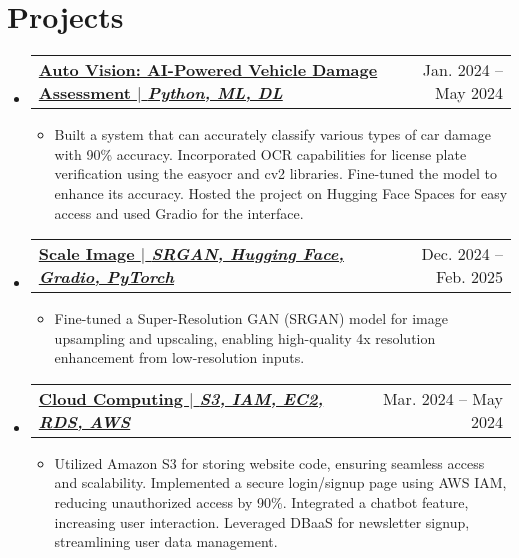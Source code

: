 \documentclass[letterpaper,10pt]{article}
\makeatletter
\newcommand{\resumeItem}[1]{
  \item\small{
    {#1 \vspace{-2pt}}
  }
}
\newcommand{\resumeProjectHeading}[3]{
    \item
    \begin{tabular*}{0.97\textwidth}{l@{\extracolsep{\fill}}r}
      \small\textbf{\href{#3}{#1}} & #2 \\
    \end{tabular*}\vspace{-7pt}
}
\newcommand{\resumeSubHeadingListStart}{\begin{itemize}[leftmargin=0.15in, label={}]}
\newcommand{\resumeSubHeadingListEnd}{\end{itemize}}
\newcommand{\resumeItemListStart}{\begin{itemize}}
\newcommand{\resumeItemListEnd}{\end{itemize}\vspace{-5pt}}
\makeatother
\begin{document}
\section{Projects}
\resumeSubHeadingListStart

  \resumeProjectHeading
    {Auto Vision: AI-Powered Vehicle Damage Assessment $|$ \emph{Python, ML, DL}}
    {Jan. 2024 -- May 2024}
    {https://www.linkedin.com/posts/chandanashastri_autovision-ai-machinelearning-activity-7190037479909969921-WMZe?utm_source=share\&utm_medium=member_desktop\&rcm=ACoAADK9cGQBBQ2ytaQ6riFqnJbrcOA1OnfGoc0}
  \resumeItemListStart
    \resumeItem{Built a system that can accurately classify various types of car damage with 90\% accuracy. Incorporated OCR capabilities for license plate verification using the easyocr and cv2 libraries. Fine-tuned the model to enhance its accuracy. Hosted the project on Hugging Face Spaces for easy access and used Gradio for the interface.}
  \resumeItemListEnd

  \resumeProjectHeading
    {Scale Image $|$ \emph{SRGAN, Hugging Face, Gradio, PyTorch}}
    {Dec. 2024 -- Feb. 2025}
    {https://huggingface.co/spaces/ChandanaShastri/SRGAN_for_Image_Upscaling}
  \resumeItemListStart
    \resumeItem{Fine-tuned a Super-Resolution GAN (SRGAN) model for image upsampling and upscaling, enabling high-quality 4x resolution enhancement from low-resolution inputs.}
  \resumeItemListEnd

  \resumeProjectHeading
    {Cloud Computing $|$ \emph{S3, IAM, EC2, RDS, AWS}}
    {Mar. 2024 -- May 2024}
    {https://www.linkedin.com/posts/chandanashastri_miniabrproject-s3-iam-activity-7192055727035748352-mi7b?utm_source=share\&utm_medium=member_desktop\&rcm=ACoAADK9cGQBBQ2ytaQ6riFqnJbrcOA1OnfGoc0}
  \resumeItemListStart
    \resumeItem{Utilized Amazon S3 for storing website code, ensuring seamless access and scalability. Implemented a secure login/signup page using AWS IAM, reducing unauthorized access by 90\%. Integrated a chatbot feature, increasing user interaction. Leveraged DBaaS for newsletter signup, streamlining user data management.}
  \resumeItemListEnd

\resumeSubHeadingListEnd

   

\end{document}
